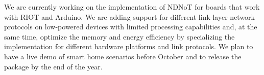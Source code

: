 \documentclass[sigconf]{acmart}
\begin{document}
We are currently working on the implementation of NDNoT for boards that work with RIOT and Arduino.
We are adding support for different link-layer network protocols on low-powered devices with limited processing capabilities and, at the same time, optimize the memory and energy efficiency by specializing the implementation for different hardware platforms and link protocols.
We plan to have a live demo of smart home scenarios before October and to release the package by the end of the year.



\end{document}
